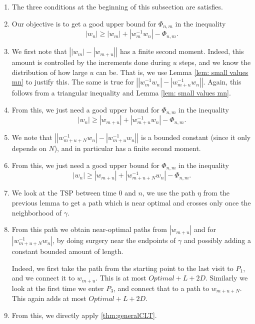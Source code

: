 \begin{enumerate}
\item The three conditions at the beginning of this subsection are satisfies.
    \item Our objective is to get a good upper bound for $\Phi_{n,m}$ in the inequality
    \[|w_n|\ge |w_m|+|w_{m}^{-1}w_n|-\Phi_{n,m}. \]
    \item We first note that $\left| |w_m|-|w_{m+u}| \right|$ has a finite second moment. Indeed, this amount is controlled by the increments done during $u$ steps, and we know the distribution of how large $u$ can be. That is, we use Lemma \ref{lem: small values mn} to justify this.  The same is true for $\left| |w_m^{-1}w_n|-|w_{m+u}^{-1}w_n| \right|$. Again, this follows from a triangular inequality and Lemma \ref{lem: small values mn}.
    \item From this, we just need a good upper bound for $\Phi_{n,m}$ in the inequality
    \[|w_n|\ge |w_{m+u}|+|w_{m+u}^{-1}w_n|-\Phi_{n,m}. \]
    \item We note that $\left||w_{m+u+N}^{-1}w_n| -|w_{m+u}^{-1}w_n|\right|$ is a bounded constant (since it only depends on $N$), and in particular has a finite second moment.
     \item From this, we just need a good upper bound for $\Phi_{n,m}$ in the inequality
    \[|w_n|\ge |w_{m+u}|+|w_{m+u+N}^{-1}w_n|-\Phi_{n,m}. \]
        \item We look at the TSP between time $0$ and $n$, we use the path $\eta$ from the previous lemma to get a path which is near optimal and crosses only once the neighborhood of $\gamma$.
    \item From this path we obtain near-optimal paths from $|w_{m+u}|$ and for $|w_{m+u+N}^{-1}w_n|$, by doing surgery near the endpoints of $\gamma$ and possibly adding a constant bounded amount of length.

    Indeed, we first take the path from the starting point to the last visit to $P_1$, and we connect it to $w_{m+u}$. This is at most $Optimal+L+2D$. Similarly we look at the first time we enter $P_3$, and connect that to a path to $w_{m+u+N}$. This again adds at most $Optimal+L+2D$.
    \item From this, we directly apply \ref{thm:generalCLT}.
\end{enumerate}
